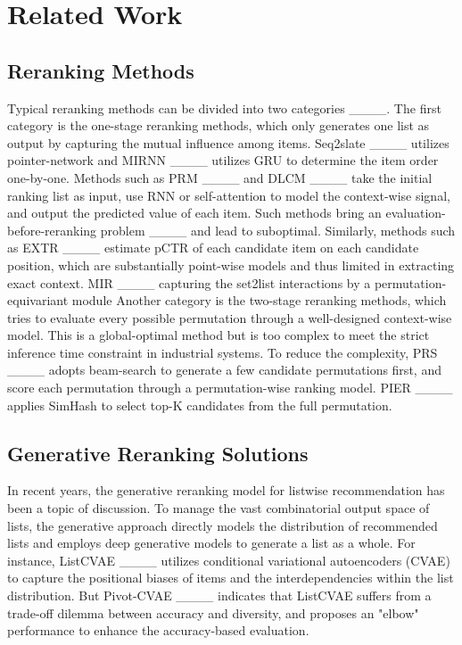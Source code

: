 \section{Related Work}
\subsection{Reranking Methods}

Typical reranking methods can be divided into two categories ____. The first category is the one-stage reranking methods, which only generates one list as output by capturing the mutual influence among items. Seq2slate ____ utilizes pointer-network and MIRNN ____ utilizes GRU to determine the item order one-by-one. Methods such as PRM ____ and DLCM ____ take the initial ranking list as input, use RNN or self-attention to model the context-wise signal, and output the predicted value of each item. Such methods bring an evaluation-before-reranking problem ____ and lead to suboptimal. Similarly, methods such as EXTR ____ estimate pCTR of each candidate item on each candidate position, which are substantially point-wise models and thus limited in extracting exact context. MIR ____ capturing the set2list interactions by a permutation-equivariant module
Another category is the two-stage reranking methods, which tries to evaluate every possible permutation through a well-designed context-wise model. This is a global-optimal method but is too complex to meet the strict inference time constraint in industrial systems. To reduce the complexity, PRS ____ adopts beam-search to generate a few candidate permutations first, and score each permutation through a permutation-wise ranking model. PIER ____ applies SimHash to select top-K candidates from the full permutation.  

\subsection{ Generative Reranking Solutions}

In recent years, the generative reranking model  for listwise recommendation has been a topic of discussion. To manage the vast combinatorial output space of lists, the generative approach directly models the distribution of recommended lists and employs deep generative models to generate a list as a whole. For instance, ListCVAE ____ utilizes conditional variational autoencoders (CVAE) to capture the positional biases of items and the interdependencies within the list distribution. But Pivot-CVAE ____ indicates that ListCVAE suffers from a trade-off dilemma between accuracy and diversity, and proposes an "elbow" performance to enhance the accuracy-based evaluation. 


